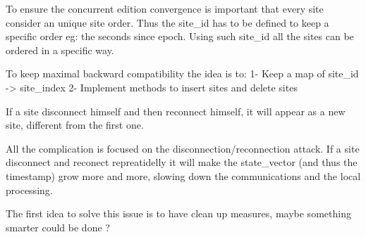 \documentclass{report}
\begin{document}

To ensure the concurrent edition convergence is important that every site consider an unique site order. Thus the site\_id has to be defined to keep a specific order eg: the seconds since epoch. Using such site\_id all the sites can be ordered in a specific way.


To keep maximal backward compatibility the idea is to:
1- Keep a map of site\_id -> site\_index
2- Implement methods to insert sites and delete sites


If a site disconnect himself and then reconnect himself, it will appear as a new site, different from the first one.

All the complication is focused on the disconnection/reconnection attack. If a site disconnect and reconect repreatidelly it will make the state\_vector (and thus the timestamp) grow more and more, slowing down the communications and the local processing. 

The first idea to solve this issue is to have clean up measures, maybe something smarter could be done ?


\end{document}
